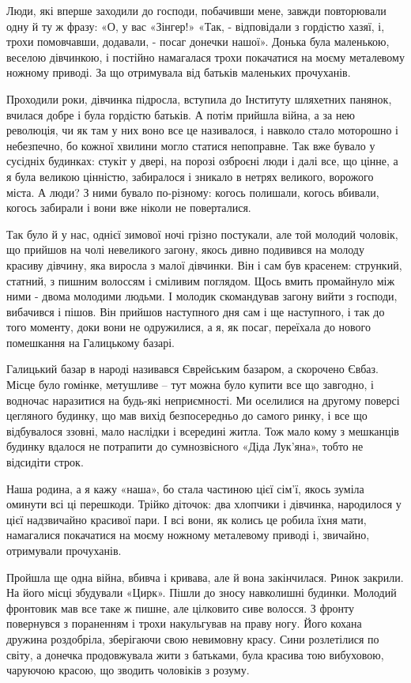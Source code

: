 Люди, які вперше заходили до господи, побачивши мене, завжди повторювали одну й
ту ж фразу: «О, у вас «Зінгер!» «Так, - відповідали з гордістю хазяї, і, трохи
помовчавши, додавали, - посаг донечки нашої». Донька була маленькою, веселою
дівчинкою, і постійно намагалася трохи покачатися на моєму металевому ножному
приводі. За що отримувала від батьків маленьких прочуханів.

Проходили роки, дівчинка підросла, вступила до Інституту шляхетних панянок,
вчилася добре і була гордістю батьків. А потім прийшла війна, а за нею
революція, чи як там у них воно все це називалося, і навколо стало моторошно і
небезпечно, бо кожної хвилини могло статися непоправне. Так вже бувало у
сусідніх будинках: стукіт у двері, на порозі озброєні люди і далі все, що
цінне, а я була великою цінністю, забиралося і зникало в нетрях великого,
ворожого міста. А люди? З ними бувало по-різному: когось полишали, когось
вбивали, когось забирали і вони вже ніколи не поверталися.

Так було й у нас, однієї зимової ночі грізно постукали, але той молодий
чоловік, що прийшов на чолі невеликого загону, якось дивно подивився на молоду
красиву дівчину, яка виросла з малої дівчинки. Він і сам був красенем:
стрункий, статний, з пишним волоссям і сміливим поглядом. Щось вмить промайнуло
між ними - двома молодими людьми. І молодик скомандував загону вийти з господи,
вибачився і пішов. Він прийшов наступного дня сам і ще наступного, і так до
того моменту, доки вони не одружилися, а я, як посаг, переїхала до нового
помешкання на Галицькому базарі.

Галицький базар в народі називався Єврейським базаром, а скорочено Євбаз. Місце
було гомінке, метушливе – тут можна було купити все що завгодно, і водночас
наразитися на будь-які неприємності. Ми оселилися на другому поверсі цегляного
будинку, що мав вихід безпосередньо до самого ринку, і все що відбувалося
ззовні, мало наслідки і всередині житла. Тож мало кому з мешканців будинку
вдалося не потрапити до сумнозвісного «Діда Лук’яна», тобто не відсидіти строк.

Наша родина, а я кажу «наша», бо стала частиною цієї сім’ї, якось зуміла
оминути всі ці перешкоди. Трійко діточок: два хлопчики і дівчинка, народилося у
цієї надзвичайно красивої пари. І всі вони, як колись це робила їхня мати,
намагалися покачатися на моєму ножному металевому приводі і, звичайно,
отримували прочуханів.

Пройшла ще одна війна, вбивча і кривава, але й вона закінчилася. Ринок закрили.
На його місці збудували «Цирк». Пішли до зносу навколишні будинки. Молодий
фронтовик мав все таке ж пишне, але цілковито сиве волосся. З фронту повернувся
з пораненням і трохи накульгував на праву ногу. Його кохана дружина роздобріла,
зберігаючи свою невимовну красу. Сини розлетілися по світу, а донечка
продовжувала жити з батьками, була красива тою вибуховою, чаруючою красою, що
зводить чоловіків з розуму.

